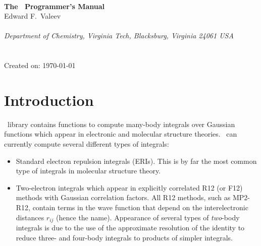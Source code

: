 \documentclass[12pt]{article}
\begin{document}


\begin{center}
\ \\
\vspace{2.0in}
{\bf {\Large The \LIBINT\ Programmer's Manual}} \\
\vspace{0.5in}
Edward F.\ Valeev \\
\ \\
{\em Department of Chemistry, Virginia Tech, Blacksburg, Virginia 24061 USA}\\
\ \\
\vspace{0.3in}
\LIBINTv \\
Created on: \today
\end{center}

\thispagestyle{empty}

\newpage
\section{Introduction}
\LIBINT\ library contains functions to compute many-body integrals over Gaussian
functions which appear in electronic and molecular structure theories.
\LIBINTv \cite{Libint1}\ can currently compute several different types of integrals:

\begin{itemize}

\item Standard electron repulsion integrals (ERIs). This is by far the most common type of
integrals in molecular structure theory.

\item Two-electron integrals which appear in explicitly correlated R12 (or F12) methods
with Gaussian correlation factors.\cite{Kutzelnigg85,Kutzelnigg91,Persson96} All R12 methods, such as
MP2-R12, contain terms in the wave function that depend on the interelectronic distances
$r_{ij}$ (hence the name). Appearance of several types of {\em two}-body integrals
is due to the use of the approximate resolution of the identity to reduce three- and four-body
integrals to products of simpler integrals.

\end{itemize}
\end{document}
